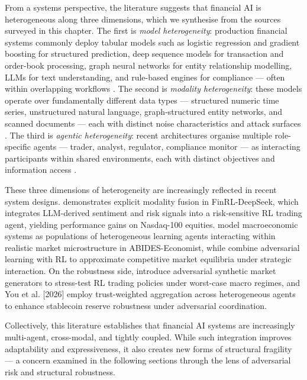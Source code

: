 From a systems perspective, the literature suggests that financial AI is heterogeneous along three dimensions, which we synthesise from the sources surveyed in this chapter. The first is \emph{model heterogeneity}: production financial systems commonly deploy tabular models such as logistic regression and gradient boosting for structured prediction, deep sequence models for transaction and order-book processing, graph neural networks for entity relationship modelling, LLMs for text understanding, and rule-based engines for compliance — often within overlapping workflows \cite{saha2025genai, benhenda2025finrl}. The second is \emph{modality heterogeneity}: these models operate over fundamentally different data types — structured numeric time series, unstructured natural language, graph-structured entity networks, and scanned documents — each with distinct noise characteristics and attack surfaces \cite{vassilev2023nist, goldblum_adversarial_2021}. The third is \emph{agentic heterogeneity}: recent architectures organise multiple role-specific agents — trader, analyst, regulator, compliance monitor — as interacting participants within shared environments, each with distinct objectives and information access \cite{dwarakanath2024abidesecon, kratsios2025market}.

These three dimensions of heterogeneity are increasingly reflected in recent system designs. \cite{benhenda2025finrl} demonstrates explicit modality fusion in FinRL-DeepSeek, which integrates LLM-derived sentiment and risk signals into a risk-sensitive RL trading agent, yielding performance gains on Nasdaq-100 equities. \cite{dwarakanath2024abidesecon} model macroeconomic systems as populations of heterogeneous learning agents interacting within realistic market microstructure in ABIDES-Economist, while \cite{kratsios2025market} combine adversarial learning with RL to approximate competitive market equilibria under strategic interaction. On the robustness side, \cite{xia_bayesian_2026} introduce adversarial synthetic market generators to stress-test RL trading policies under worst-case macro regimes, and You et al. [2026] employ trust-weighted aggregation across heterogeneous agents to enhance stablecoin reserve robustness under adversarial coordination.

Collectively, this literature establishes that financial AI systems are increasingly multi-agent, cross-modal, and tightly coupled. While such integration improves adaptability and expressiveness, it also creates new forms of structural fragility — a concern examined in the following sections through the lens of adversarial risk and structural robustness.


